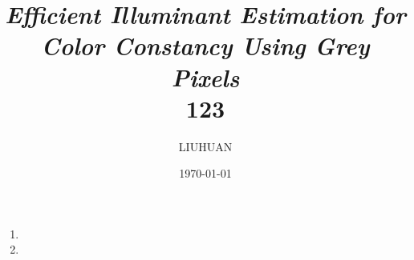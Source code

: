 \documentclass[a4paper,40pt]{article}
\begin{document}
        \title{\textit{Efficient Illuminant Estimation for Color Constancy Using Grey Pixels} \\123 }
        \author{LIUHUAN}
        \date{\today }
\maketitle

	
		\begin{enumerate}
		\item
	
		\item
	
		\end{enumerate}
	


    \section{}
  
    \section{}
        \paragraph{}
       
        
\end{document}
